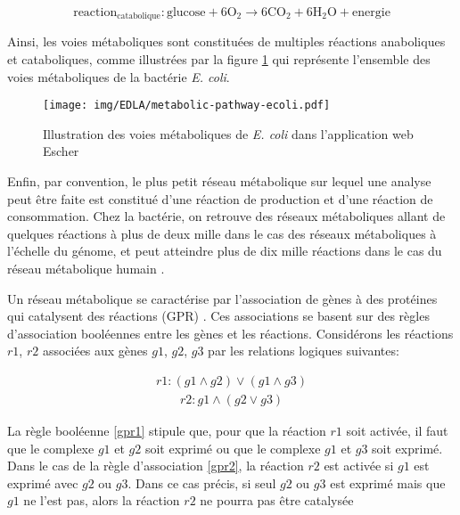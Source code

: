 \documentclass[../main.tex]{subfiles}
\begin{document}
\[
\text{reaction}_\text{catabolique} : \text{glucose} + 6\text{O}_2\rightarrow 6\text{CO}_2 + 6\text{H}_2\text{O} + \text{energie} 
\]

Ainsi, les voies métaboliques sont constituées de multiples réactions anaboliques et cataboliques, comme illustrées par la figure \ref{fig:metabolic-pathways} qui représente l'ensemble des voies métaboliques de la bactérie \textit{E. coli}.

\begin{figure}[H]
    \centering
    \texttt{[image: img/EDLA/metabolic-pathway-ecoli.pdf]}
    \caption{Illustration des voies métaboliques de \textit{E. coli} dans l'application web Escher \citep{King2015}}
    \label{fig:metabolic-pathways}
\end{figure}

Enfin, par convention, le plus petit réseau métabolique sur lequel une analyse peut être faite est constitué d'une réaction de production et d'une réaction de consommation. Chez la bactérie, on retrouve des réseaux métaboliques allant de quelques réactions à plus de deux mille dans le cas des réseaux métaboliques à l'échelle du génome, et peut atteindre plus de dix mille réactions dans le cas du réseau métabolique humain \citep{Robinson2020}.

Un réseau métabolique se caractérise par l'association de gènes à des protéines qui catalysent des réactions (GPR) \cite{Thiele.2010}. Ces associations se basent sur des règles d'association booléennes entre les gènes et les réactions. Considérons les réactions $r1$, $r2$ associées aux gènes $g1$, $g2$, $g3$ par les relations logiques suivantes:

\begin{align}
\label{gpr1}
    r1 : (g1 \land g2) \lor (g1 \land g3)
\end{align}
\begin{align}
\label{gpr2}
    r2 : g1 \land (g2 \lor g3)
\end{align}

La règle booléenne \ref{gpr1} stipule que, pour que la réaction $r1$ soit activée, il faut que le complexe $g1$ et $g2$ soit exprimé ou que le complexe $g1$ et $g3$ soit exprimé. Dans le cas de la règle d'association \ref{gpr2}, la réaction $r2$ est activée si $g1$ est exprimé avec $g2$ ou $g3$. Dans ce cas précis, si seul $g2$ ou $g3$ est exprimé mais que $g1$ ne l'est pas, alors la réaction $r2$ ne pourra pas être catalysée \\
\end{document}
